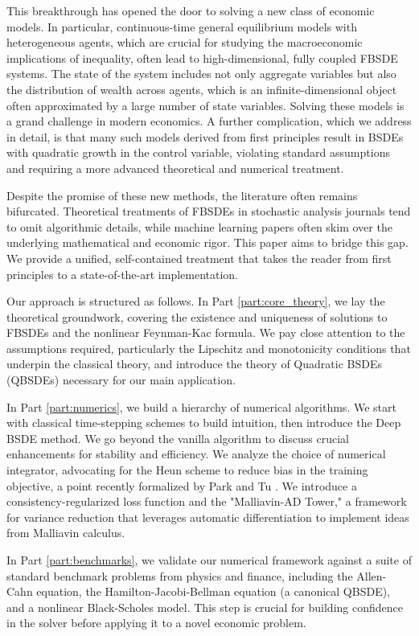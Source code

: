 \documentclass[11pt,letterpaper,oneside]{article}
\theoremstyle{plain}
\theoremstyle{definition}
\theoremstyle{remark}
\begin{document}
This breakthrough has opened the door to solving a new class of economic models. In particular, continuous-time general equilibrium models with heterogeneous agents, which are crucial for studying the macroeconomic implications of inequality, often lead to high-dimensional, fully coupled FBSDE systems. The state of the system includes not only aggregate variables but also the distribution of wealth across agents, which is an infinite-dimensional object often approximated by a large number of state variables. Solving these models is a grand challenge in modern economics. A further complication, which we address in detail, is that many such models derived from first principles result in BSDEs with quadratic growth in the control variable, violating standard assumptions and requiring a more advanced theoretical and numerical treatment.

Despite the promise of these new methods, the literature often remains bifurcated. Theoretical treatments of FBSDEs in stochastic analysis journals tend to omit algorithmic details, while machine learning papers often skim over the underlying mathematical and economic rigor. This paper aims to bridge this gap. We provide a unified, self-contained treatment that takes the reader from first principles to a state-of-the-art implementation.

Our approach is structured as follows. In Part \ref{part:core_theory}, we lay the theoretical groundwork, covering the existence and uniqueness of solutions to FBSDEs and the nonlinear Feynman-Kac formula. We pay close attention to the assumptions required, particularly the Lipschitz and monotonicity conditions that underpin the classical theory, and introduce the theory of Quadratic BSDEs (QBSDEs) necessary for our main application.

In Part \ref{part:numerics}, we build a hierarchy of numerical algorithms. We start with classical time-stepping schemes to build intuition, then introduce the Deep BSDE method. We go beyond the vanilla algorithm to discuss crucial enhancements for stability and efficiency. We analyze the choice of numerical integrator, advocating for the Heun scheme to reduce bias in the training objective, a point recently formalized by Park and Tu \cite{ParkTu2025}. We introduce a consistency-regularized loss function and the "Malliavin-AD Tower," a framework for variance reduction that leverages automatic differentiation to implement ideas from Malliavin calculus.

In Part \ref{part:benchmarks}, we validate our numerical framework against a suite of standard benchmark problems from physics and finance, including the Allen-Cahn equation, the Hamilton-Jacobi-Bellman equation (a canonical QBSDE), and a nonlinear Black-Scholes model. This step is crucial for building confidence in the solver before applying it to a novel economic problem.
\end{document}
